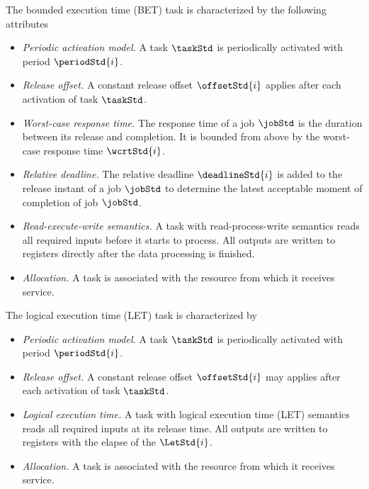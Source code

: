 \begin{definition}
The bounded execution time (BET) task is characterized by the following attributes
	\begin{itemize}[leftmargin=*,itemsep=0pt]
	\item \emph{Periodic activation model.} A task $\taskStd$ is periodically activated with period $\periodStd{i}$.
	\item \emph{Release offset.} A constant release offset $\offsetStd{i}$ applies after each activation of task $\taskStd$.	
	\item \emph{Worst-case response time.} The response time of a job $\jobStd$ is the duration between its release and completion. 
	It is bounded from above by the worst-case response time $\wcrtStd{i}$.
	\item \emph{Relative deadline.} The relative deadline $\deadlineStd{i}$ is added to the release instant of a job $\jobStd$ to determine the latest acceptable moment of completion of job $\jobStd$.
	\item \emph{Read-execute-write semantics.} A task with read-process-write semantics reads all required inputs before it starts to process. All outputs are written to registers directly after the data processing is finished. 
	\item \emph{Allocation.} A task is associated with the resource from which it receives service.	
\end{itemize}
\end{definition}

\begin{definition}
The logical execution time (LET) task is characterized by
\begin{itemize}[leftmargin=*,itemsep=0pt]
	\item \emph{Periodic activation model.} A task $\taskStd$ is periodically activated with period $\periodStd{i}$.
	\item \emph{Release offset.} A constant release offset $\offsetStd{i}$ may applies after each activation of task $\taskStd$.	
		\item \emph{Logical execution time.} A task with logical execution time (LET) semantics reads all required inputs at its release time.  All outputs are written to registers with the elapse of the $\LetStd{i}$. 
	\item \emph{Allocation.} A task is associated with the resource from which it receives service.		
\end{itemize}
\end{definition}
%
\bigskip

